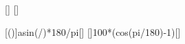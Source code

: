 [\mpss]
[\mpss]

[\arcsin\left(\right)]{asin(\aEbX/\gEX)*180/pi}[\degree]
[\cos{}]{100*(cos(\wiX*pi/180)-1)}[\percent]
